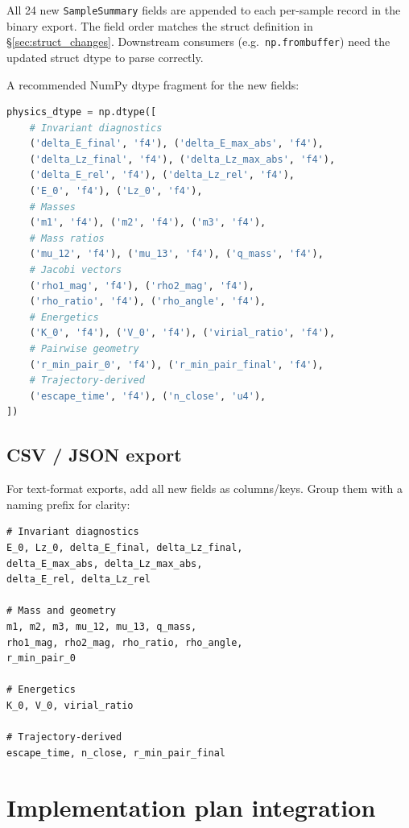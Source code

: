 \documentclass[11pt]{article}
\newcommand{\struct}[1]{\texttt{#1}}
\begin{document}
All 24 new \struct{SampleSummary} fields are appended to each per-sample
record in the binary export. The field order matches the struct definition in
\S\ref{sec:struct_changes}. Downstream consumers (e.g.\ \texttt{np.frombuffer})
need the updated struct dtype to parse correctly.

A recommended NumPy dtype fragment for the new fields:

\begin{lstlisting}[language=Python]
physics_dtype = np.dtype([
    # Invariant diagnostics
    ('delta_E_final', 'f4'), ('delta_E_max_abs', 'f4'),
    ('delta_Lz_final', 'f4'), ('delta_Lz_max_abs', 'f4'),
    ('delta_E_rel', 'f4'), ('delta_Lz_rel', 'f4'),
    ('E_0', 'f4'), ('Lz_0', 'f4'),
    # Masses
    ('m1', 'f4'), ('m2', 'f4'), ('m3', 'f4'),
    # Mass ratios
    ('mu_12', 'f4'), ('mu_13', 'f4'), ('q_mass', 'f4'),
    # Jacobi vectors
    ('rho1_mag', 'f4'), ('rho2_mag', 'f4'),
    ('rho_ratio', 'f4'), ('rho_angle', 'f4'),
    # Energetics
    ('K_0', 'f4'), ('V_0', 'f4'), ('virial_ratio', 'f4'),
    # Pairwise geometry
    ('r_min_pair_0', 'f4'), ('r_min_pair_final', 'f4'),
    # Trajectory-derived
    ('escape_time', 'f4'), ('n_close', 'u4'),
])
\end{lstlisting}

\subsection{CSV / JSON export}

For text-format exports, add all new fields as columns/keys. Group them
with a naming prefix for clarity:

\begin{lstlisting}
# Invariant diagnostics
E_0, Lz_0, delta_E_final, delta_Lz_final,
delta_E_max_abs, delta_Lz_max_abs,
delta_E_rel, delta_Lz_rel

# Mass and geometry
m1, m2, m3, mu_12, mu_13, q_mass,
rho1_mag, rho2_mag, rho_ratio, rho_angle,
r_min_pair_0

# Energetics
K_0, V_0, virial_ratio

# Trajectory-derived
escape_time, n_close, r_min_pair_final
\end{lstlisting}

\section{Implementation plan integration}
\label{sec:plan}
\end{document}
